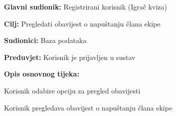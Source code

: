 				
				\noindent {}
				\begin{packed_item}
					
					\item \textbf{Glavni sudionik:} Registrirani korisnik (Igrač  kviza)
					\item  \textbf{Cilj:} Pregledati obavijest o napuštanju člana ekipe
					\item  \textbf{Sudionici:} Baza podataka
					\item  \textbf{Preduvjet:} Korisnik je prijavljen u sustav
					\item  \textbf{Opis osnovnog tijeka:}
					
					\item[] \begin{packed_enum}
						
						\item Korisnik odabire opciju za pregled obavijesti
						\item Korisnik pregledava obavijest o napuštanju člana ekipe
					\end{packed_enum}
					
				\end{packed_item}
				

